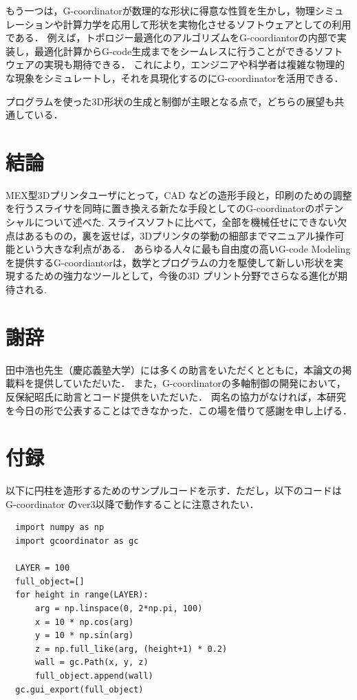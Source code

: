 \documentclass{article}
\begin{document}
\begin{twocolumn}
もう一つは，G-coordinatorが数理的な形状に得意な性質を生かし，物理シミュレーションや計算力学を応用して形状を実物化させるソフトウェアとしての利用である．
例えば，トポロジー最適化のアルゴリズムをG-coordiantorの内部で実装し，最適化計算からG-code生成までをシームレスに行うことができるソフトウェアの実現も期待できる．
これにより，エンジニアや科学者は複雑な物理的な現象をシミュレートし，それを具現化するのにG-coordinatorを活用できる．

プログラムを使った3D形状の生成と制御が主眼となる点で，どちらの展望も共通している．

\section{結論}

MEX型3Dプリンタユーザにとって，CAD などの造形手段と，印刷のための調整を行うスライサを同時に置き換える新たな手段としてのG-coordinatorのポテンシャルについて述べた.
スライスソフトに比べて，全部を機械任せにできない欠点はあるものの，裏を返せば，3Dプリンタの挙動の細部までマニュアル操作可能という大きな利点がある．
あらゆる人々に最も自由度の高いG-code Modelingを提供するG-coordiantorは，数学とプログラムの力を駆使して新しい形状を実現するための強力なツールとして，今後の3D プリント分野でさらなる進化が期待される.


\section{謝辞}
田中浩也先生（慶応義塾大学）には多くの助言をいただくとともに，本論文の掲載料を提供していただいた．
また，G-coordinatorの多軸制御の開発において，反保紀昭氏に助言とコード提供をいただいた．
両名の協力がなければ，本研究を今日の形で公表することはできなかった．この場を借りて感謝を申し上げる．


\section{付録}
以下に円柱を造形するためのサンプルコードを示す．ただし，以下のコードはG-coordinator  のver3以降で動作することに注意されたい．

\begin{lstlisting}
  import numpy as np
  import gcoordinator as gc
  
  LAYER = 100
  full_object=[]
  for height in range(LAYER):
      arg = np.linspace(0, 2*np.pi, 100)
      x = 10 * np.cos(arg)
      y = 10 * np.sin(arg)
      z = np.full_like(arg, (height+1) * 0.2)
      wall = gc.Path(x, y, z)
      full_object.append(wall)
  gc.gui_export(full_object)
\end{lstlisting}


\end{twocolumn}
\end{document}
